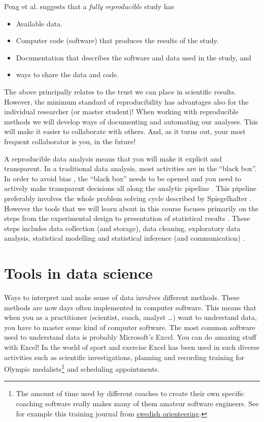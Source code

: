 \documentclass[
  11pt,
]{krantz}
\providecommand{\tightlist}{%
  \setlength{\itemsep}{0pt}\setlength{\parskip}{0pt}}
\begin{document}
Peng et al. \citep{RN1492} suggests that a \emph{fully reproducible} study has

\begin{itemize}
\tightlist
\item
  Available data.
\item
  Computer code (software) that produces the results of the study.
\item
  Documentation that describes the software and data used in the study, and
\item
  ways to share the data and code.
\end{itemize}

The above principally relates to the trust we can place in scientific results. However, the minimum standard of reproducibility has advantages also for the individual researcher (or master student)! When working with reproducible methods we will develop ways of documenting and automating our analyses. This will make it easier to collaborate with others. And, as it turns out, your most frequent collaborator is you, in the future!

A reproducible data analysis means that you will make it explicit and transparent. In a traditional data analysis, most activities are in the ``black box''. In order to avoid bias \citep{RN1953}, the ``black box'' needs to be opened and you need to actively make transparent decisions all along the analytic pipeline \citep{RN1955}. This pipeline preferably involves the whole problem solving cycle described by Spiegelhalter \citep{RN2902}. However the tools that we will learn about in this course focuses primarily on the steps from the experimental design to presentation of statistical results \citep{RN1955}. These steps includes data collection (and storage), data cleaning, exploratory data analysis, statistical modelling and statistical inference (and communication) \citep{RN1955}.

\hypertarget{tools-in-data-science}{%
\section{Tools in data science}\label{tools-in-data-science}}

Ways to interpret and make sense of data involves different methods. These methods are now days often implemented in computer software. This means that when you as a practitioner (scientist, coach, analyst \ldots) want to understand data, you have to master some kind of computer software. The most common software used to understand data is probably Microsoft's Excel. You can do amazing stuff with Excel! In the world of sport and exercise Excel has been used in such diverse activities such as scientific investigations, planning and recording training for Olympic medalists\footnote{The amount of time used by different coaches to create their own specific coaching software really makes many of them amateur software engineers. See for example this training journal from \href{http://obasen.orientering.se/traningsdagbok/installationshandledning.htm}{swedish orienteering}.} and scheduling appointments.
\end{document}
